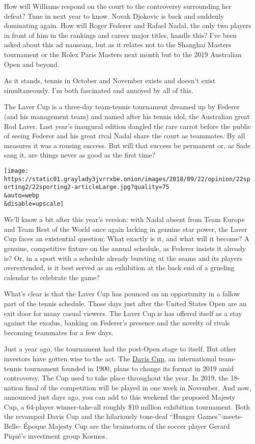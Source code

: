 How will Williams respond on the court to the controversy surrounding
her defeat? Tune in next year to know. Novak Djokovic is back and
suddenly dominating again. How will Roger Federer and Rafael Nadal, the
only two players in front of him in the rankings and career major
titles, handle this? I've been asked about this ad nauseam, but as it
relates not to the Shanghai Masters tournament or the Rolex Paris
Masters next month but to the 2019 Australian Open and beyond.

As it stands, tennis in October and November exists and doesn't exist
simultaneously. I'm both fascinated and annoyed by all of this.

The Laver Cup is a three-day team-tennis tournament dreamed up by
Federer (and his management team) and named after his tennis idol, the
Australian great Rod Laver. Last year's inaugural edition dangled the
rare carrot before the public of seeing Federer and his great rival
Nadal share the court as teammates. By all measures it was a rousing
success. But will that success be permanent or, as Sade sang it, are
things never as good as the first time?

\texttt{[image: https://static01.graylady3jvrrxbe.onion/images/2018/09/22/opinion/22sporting2/22sporting2-articleLarge.jpg?quality=75\\\&auto=webp\\\&disable=upscale]}

We'll know a bit after this year's version: with Nadal absent from Team
Europe and Team Rest of the World once again lacking in genuine star
power, the Laver Cup faces an existential question: What exactly is it,
and what will it become? A genuine, competitive fixture on the annual
schedule, as Federer insists it already is? Or, in a sport with a
schedule already bursting at the seams and its players overextended, is
it best served as an exhibition at the back end of a grueling calendar
to celebrate the game?

What's clear is that the Laver Cup has pounced on an opportunity in a
fallow part of the tennis schedule. Those days just after the United
States Open are an exit door for many casual viewers. The Laver Cup is
has offered itself as a stay against the exodus, banking on Federer's
presence and the novelty of rivals becoming teammates for a few days.

Just a year ago, the tournament had the post-Open stage to itself. But
other investors have gotten wise to the act. The
\href{https://www.daviscup.com/en/organisation/davis-cup-history.aspx}{Davis
Cup}, an international team-tennis tournament founded in 1900, plans to
change its format in 2019 amid controversy. The Cup used to take place
throughout the year. In 2019, the 18-nation final of the competition
will be played in one week in November. And now, announced just days
ago, you can add to this weekend the proposed Majesty Cup, a 64-player
winner-take-all roughly \$10 million exhibition tournament. Both the
revamped Davis Cup and the hilariously tone-deaf ``Hunger
Games''-meets-Belle- Époque Majesty Cup are the brainstorm of the soccer
player Gerard Piqué's investment group Kosmos.

